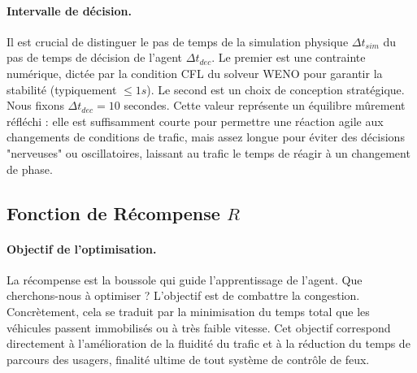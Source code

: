 \paragraph{Intervalle de décision.} Il est crucial de distinguer le pas de temps de la simulation physique $\Delta t_{sim}$ du pas de temps de décision de l'agent $\Delta t_{dec}$. Le premier est une contrainte numérique, dictée par la condition CFL du solveur WENO pour garantir la stabilité (typiquement $\leq 1s$). Le second est un choix de conception stratégique. Nous fixons $\Delta t_{dec}=10$ secondes. Cette valeur représente un équilibre mûrement réfléchi : elle est suffisamment courte pour permettre une réaction agile aux changements de conditions de trafic, mais assez longue pour éviter des décisions "nerveuses" ou oscillatoires, laissant au trafic le temps de réagir à un changement de phase.

\subsection{Fonction de Récompense $R$}
\label{subsec:fonction_recompense}

\paragraph{Objectif de l'optimisation.} La récompense est la boussole qui guide l'apprentissage de l'agent. Que cherchons-nous à optimiser ? L'objectif est de combattre la congestion. Concrètement, cela se traduit par la minimisation du temps total que les véhicules passent immobilisés ou à très faible vitesse. Cet objectif correspond directement à l'amélioration de la fluidité du trafic et à la réduction du temps de parcours des usagers, finalité ultime de tout système de contrôle de feux.

